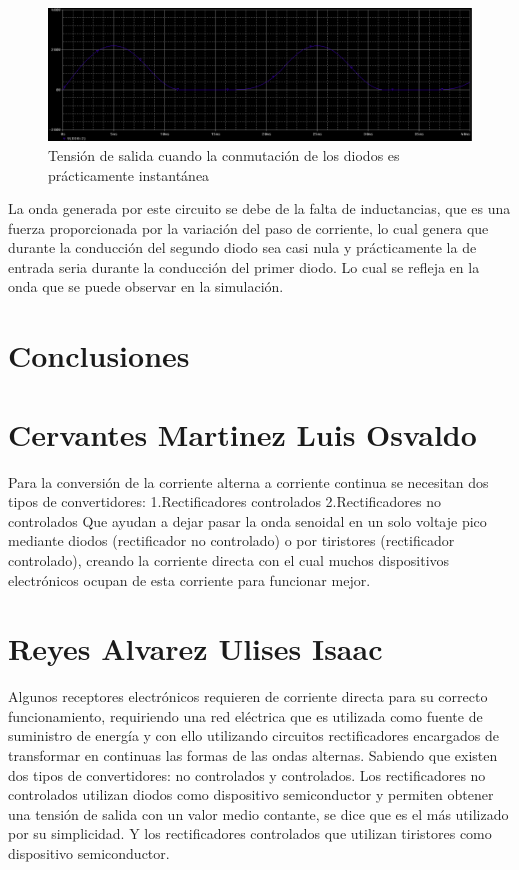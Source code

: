 \documentclass[12pt,a4paper]{article}
\begin{document}
\begin{figure}[hbtp]
\centering
\includegraphics[scale=0.35]{14.png}
\caption{Tensión de salida cuando la conmutación de los diodos es prácticamente instantánea}
\end{figure}
La onda generada por este circuito se debe de la falta de inductancias, que es una fuerza proporcionada por la variación del paso de corriente, lo cual genera que durante la conducción del segundo diodo sea casi nula y prácticamente la de entrada seria durante la conducción del primer diodo. Lo cual se refleja en la onda que se puede observar en la simulación. 

\newpage
\section*{Conclusiones}
\section*{Cervantes Martinez Luis Osvaldo}
Para la conversión de la corriente alterna a corriente continua se necesitan dos tipos de convertidores:
1.Rectificadores controlados 
2.Rectificadores no controlados
Que ayudan a dejar pasar la onda senoidal en un solo voltaje pico mediante diodos (rectificador no controlado) o por tiristores (rectificador controlado), creando la corriente directa con el cual muchos dispositivos electrónicos ocupan de esta corriente para funcionar mejor.

\section*{Reyes Alvarez Ulises Isaac}
Algunos receptores electrónicos requieren de corriente directa para su correcto funcionamiento, requiriendo una red eléctrica que es utilizada como fuente de suministro de energía y con ello utilizando circuitos rectificadores encargados de transformar en continuas las formas de las ondas alternas. Sabiendo que existen dos tipos de convertidores: no controlados y controlados.
Los rectificadores no controlados utilizan diodos como dispositivo semiconductor y permiten obtener una tensión de salida con un valor medio contante, se dice que es el más utilizado por su simplicidad.
Y los rectificadores controlados que utilizan tiristores como dispositivo semiconductor. 
\end{document}
